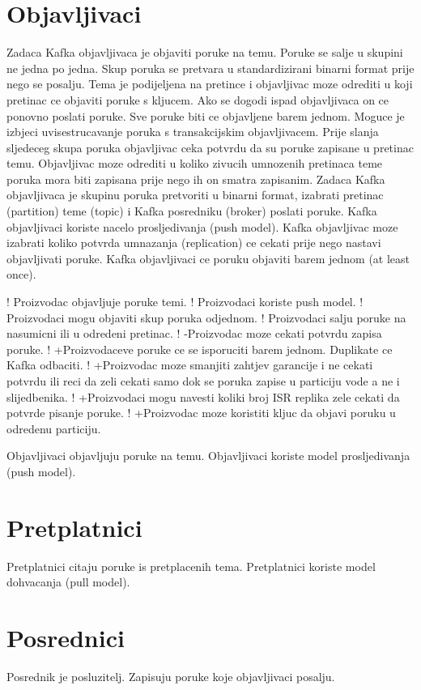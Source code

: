 \documentclass[times, utf8, diplomski, numeric]{fer}
\begin{document}
\chapter{Objavljivaci}
Zadaca Kafka objavljivaca je objaviti poruke na temu. Poruke se salje u skupini ne jedna po jedna. Skup poruka se pretvara u standardizirani binarni format prije nego se posalju. Tema je podijeljena na pretince i objavljivac moze odrediti u koji pretinac ce objaviti poruke s kljucem. Ako se dogodi ispad objavljivaca on ce ponovno poslati poruke. Sve poruke biti ce objavljene barem jednom. Moguce je izbjeci uvisestrucavanje poruka s transakcijskim objavljivacem. Prije slanja sljedeceg skupa poruka objavljivac ceka potvrdu da su poruke zapisane u pretinac temu. Objavljivac moze odrediti u koliko zivucih umnozenih pretinaca teme poruka mora biti zapisana prije nego ih on smatra zapisanim.
Zadaca Kafka objavljivaca je skupinu poruka pretvoriti u binarni format, izabrati pretinac (partition) teme (topic) i Kafka posredniku (broker) poslati poruke. Kafka objavljivaci koriste nacelo prosljedivanja (push model). Kafka objavljivac moze izabrati koliko potvrda umnazanja (replication) ce cekati prije nego nastavi objavljivati poruke. Kafka objavljivaci ce poruku objaviti barem jednom (at least once).

! Proizvodac objavljuje poruke temi.
! Proizvodaci koriste push model.
! Proizvodaci mogu objaviti skup poruka odjednom.
! Proizvodaci salju poruke na nasumicni ili u odredeni pretinac.
! -Proizvodac moze cekati potvrdu zapisa poruke.
! +Proizvodaceve poruke ce se isporuciti barem jednom. Duplikate ce Kafka odbaciti.
! +Proizvodac moze smanjiti zahtjev garancije i ne cekati potvrdu ili reci da zeli cekati samo dok se poruka zapise u particiju vode a ne i slijedbenika. 
! +Proizvodaci mogu navesti koliki broj ISR replika zele cekati da potvrde pisanje poruke.
! +Proizvodac moze koristiti kljuc da objavi poruku u odredenu particiju.

Objavljivaci objavljuju poruke na temu. Objavljivaci koriste model prosljedivanja (push model). 

\chapter{Pretplatnici}
Pretplatnici citaju poruke is pretplacenih tema. Pretplatnici koriste model dohvacanja (pull model).


\chapter{Posrednici}
Posrednik je posluzitelj. Zapisuju poruke koje objavljivaci posalju.
\end{document}
